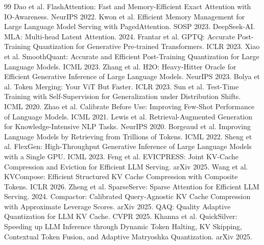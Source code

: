 \documentclass[11pt,a4paper]{article}
\theoremstyle{plain}
\theoremstyle{definition}
\begin{document}
\begin{thebibliography}{99}
 Dao et al. FlashAttention: Fast and Memory-Efficient Exact Attention with IO-Awareness. NeurIPS 2022.
 Kwon et al. Efficient Memory Management for Large Language Model Serving with PagedAttention. SOSP 2023.
 DeepSeek-AI. MLA: Multi-head Latent Attention. 2024.
 Frantar et al. GPTQ: Accurate Post-Training Quantization for Generative Pre-trained Transformers. ICLR 2023.
 Xiao et al. SmoothQuant: Accurate and Efficient Post-Training Quantization for Large Language Models. ICML 2023.
 Zhang et al. H2O: Heavy-Hitter Oracle for Efficient Generative Inference of Large Language Models. NeurIPS 2023.
 Bolya et al. Token Merging: Your ViT But Faster. ICLR 2023.
 Sun et al. Test-Time Training with Self-Supervision for Generalization under Distribution Shifts. ICML 2020.
 Zhao et al. Calibrate Before Use: Improving Few-Shot Performance of Language Models. ICML 2021.
 Lewis et al. Retrieval-Augmented Generation for Knowledge-Intensive NLP Tasks. NeurIPS 2020.
 Borgeaud et al. Improving Language Models by Retrieving from Trillions of Tokens. ICML 2022.
 Sheng et al. FlexGen: High-Throughput Generative Inference of Large Language Models with a Single GPU. ICML 2023.
 Feng et al. EVICPRESS: Joint KV-Cache Compression and Eviction for Efficient LLM Serving. arXiv 2025.
 Wang et al. KVCompose: Efficient Structured KV Cache Compression with Composite Tokens. ICLR 2026.
 Zheng et al. SparseServe: Sparse Attention for Efficient LLM Serving. 2024.
 Compactor: Calibrated Query-Agnostic KV Cache Compression with Approximate Leverage Scores. arXiv 2025.
 QAQ: Quality Adaptive Quantization for LLM KV Cache. CVPR 2025.
 Khanna et al. QuickSilver: Speeding up LLM Inference through Dynamic Token Halting, KV Skipping, Contextual Token Fusion, and Adaptive Matryoshka Quantization. arXiv 2025.
\end{thebibliography}
\end{document}
